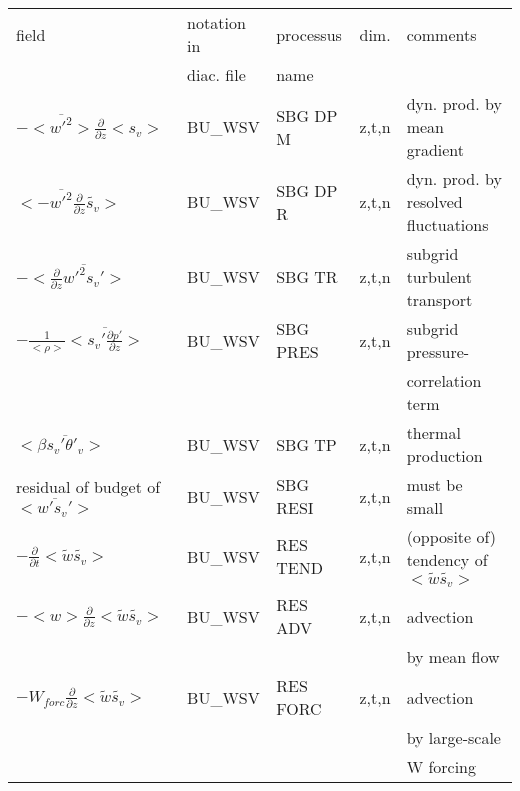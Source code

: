 \begin{center}
\begin{tabular}{||p{5cm}|>{\centering}p{2cm}|>{\centering}p{2.5cm}|>{\centering}p{0.5cm}|p{5.5cm }||}
\hline
\hline
field & notation in & processus & dim.  & comments \\
      & diac. file & name      &            & \\
\hline
\hline
$-<\overline{w'^2}>\frac{\partial }{\partial z}<s_v>$ & BU\_WSV & SBG DP M & z,t,n & dyn. prod. by mean gradient \\
\hline
$<-\overline{w'^2}\frac{\partial}{\partial z}\tilde{s_v}>$ & BU\_WSV & SBG DP R & z,t,n & dyn. prod. by resolved fluctuations\\
\hline
$-<\frac{\partial}{\partial z}\overline{w'^2s_v'}>$ & BU\_WSV & SBG TR   & z,t,n & subgrid turbulent transport\\
\hline
$- \frac{1}{<\rho>}<\overline{s_v' \frac{\partial p'}{\partial z}}>$&
BU\_WSV & SBG PRES & z,t,n & subgrid pressure-\\
 & & & &correlation term \\
\hline
$<\beta  \overline{s_v'\theta'_v}>$ & BU\_WSV & SBG TP   & z,t,n & thermal production \\
\hline
{\rm residual of budget of} $<\overline{w's_v'}>$ & BU\_WSV & SBG RESI & z,t,n & must be small \\
\hline
$-\frac{\partial }{\partial t}<\tilde{w}\tilde{s_v}>$ & BU\_WSV & RES TEND & z,t,n & (opposite of) tendency of $<\tilde{w}\tilde{s_v}>$\\
\hline
$-<w>\frac{\partial}{\partial z}<\tilde{w}\tilde{s_v}>$ & BU\_WSV & RES ADV  & z,t,n & advection \\
 & & & & by mean flow\\
\hline
$-W_{forc}\frac{\partial}{\partial z}<\tilde{w}\tilde{s_v}>$ & BU\_WSV & RES FORC & z,t,n & advection \\
 & & & & by large-scale\\
 & & & & W forcing\\
\hline \hline
\end{tabular}
\end{center}


